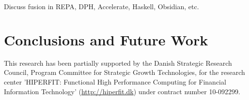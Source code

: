 \documentclass{sigplanconf}  %
\begin{document}
Discuss fusion in REPA, DPH, Accelerate, Haskell, Obsidian, etc.

\section{Conclusions and Future Work}
\label{sec:Concl}




%



\acks
This research has been partially supported by the Danish
Strategic Research Council, Program Committee for Strategic Growth
Technologies, for the research center 'HIPERFIT: Functional High
Performance Computing for Financial Information Technology'
(\url{http://hiperfit.dk}) under contract number 10-092299.




\softraggedright

\end{document}
